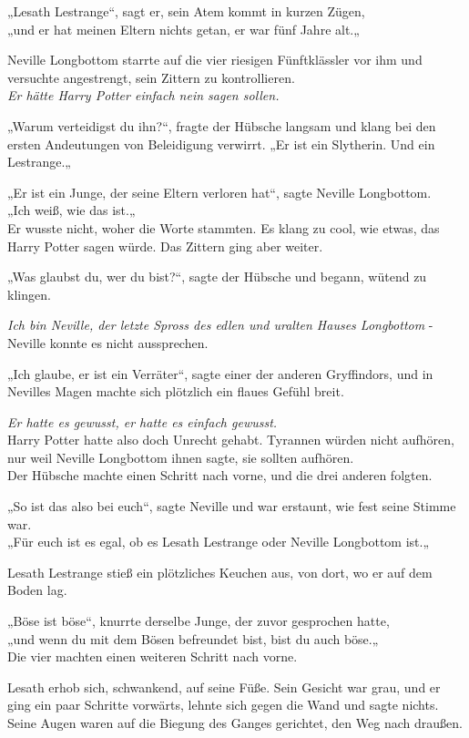 {„Lesath Lestrange“, sagt er, sein Atem kommt in kurzen Zügen,\\ „und er hat meinen Eltern nichts getan, er war fünf Jahre alt.„

Neville Longbottom starrte auf die vier riesigen Fünftklässler vor ihm und versuchte angestrengt, sein Zittern zu kontrollieren.\\ \emph{Er hätte Harry Potter einfach nein sagen sollen.}

„Warum verteidigst du ihn?“, fragte der Hübsche langsam und klang bei den ersten Andeutungen von Beleidigung verwirrt. „Er ist ein Slytherin. Und ein Lestrange.„

„Er ist ein Junge, der seine Eltern verloren hat“, sagte Neville Longbottom.\\ „Ich weiß, wie das ist.„\\ Er wusste nicht, woher die Worte stammten. Es klang zu cool, wie etwas, das Harry Potter sagen würde. Das Zittern ging aber weiter.

„Was glaubst du, wer du bist?“, sagte der Hübsche und begann, wütend zu klingen.

\emph{Ich bin Neville, der letzte Spross des edlen und uralten Hauses Longbottom} - Neville konnte es nicht aussprechen.

„Ich glaube, er ist ein Verräter“, sagte einer der anderen Gryffindors, und in Nevilles Magen machte sich plötzlich ein flaues Gefühl breit.

\emph{Er hatte es gewusst, er hatte es einfach gewusst.}\\ Harry Potter hatte also doch Unrecht gehabt. Tyrannen würden nicht aufhören, nur weil Neville Longbottom ihnen sagte, sie sollten aufhören.\\ Der Hübsche machte einen Schritt nach vorne, und die drei anderen folgten.

„So ist das also bei euch“, sagte Neville und war erstaunt, wie fest seine Stimme war.\\ „Für euch ist es egal, ob es Lesath Lestrange oder Neville Longbottom ist.„

Lesath Lestrange stieß ein plötzliches Keuchen aus, von dort, wo er auf dem Boden lag.

„Böse ist böse“, knurrte derselbe Junge, der zuvor gesprochen hatte,\\ „und wenn du mit dem Bösen befreundet bist, bist du auch böse.„\\ Die vier machten einen weiteren Schritt nach vorne.

Lesath erhob sich, schwankend, auf seine Füße. Sein Gesicht war grau, und er ging ein paar Schritte vorwärts, lehnte sich gegen die Wand und sagte nichts.\\ Seine Augen waren auf die Biegung des Ganges gerichtet, den Weg nach draußen.

}
